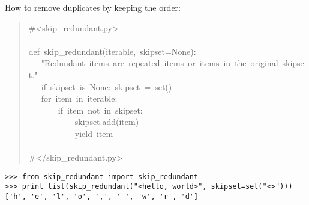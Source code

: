 \documentclass[10pt,a4paper,english]{article}
\begin{document}
How to remove duplicates by keeping the order:
\begin{quote}{\ttfamily \raggedright \noindent
{\#}<skip{\_}redundant.py>~\\
~\\
def~skip{\_}redundant(iterable,~skipset=None):~\\
~~~"Redundant~items~are~repeated~items~or~items~in~the~original~skipset."~\\
~~~if~skipset~is~None:~skipset~=~set()~\\
~~~for~item~in~iterable:~\\
~~~~~~~if~item~not~in~skipset:~\\
~~~~~~~~~~~skipset.add(item)~\\
~~~~~~~~~~~yield~item~\\
~~~~~~~~~~\\
{\#}</skip{\_}redundant.py>
}\end{quote}
\begin{verbatim}>>> from skip_redundant import skip_redundant
>>> print list(skip_redundant("<hello, world>", skipset=set("<>")))
['h', 'e', 'l', 'o', ',', ' ', 'w', 'r', 'd']\end{verbatim}



\hypertarget{another-real-life-example-working-with-nested-structures}{}
\end{document}
